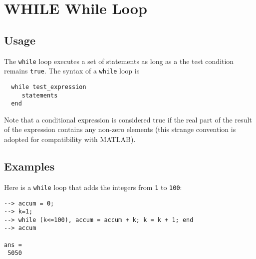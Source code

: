\section{WHILE While Loop}

\subsection{Usage}

The \verb|while| loop executes a set of statements as long as
a the test condition remains \verb|true|.  The syntax of a
\verb|while| loop is
\begin{verbatim}
  while test_expression
     statements
  end
\end{verbatim}
Note that a conditional expression is considered true if
the real part of the result of the expression contains
any non-zero elements (this strange convention is adopted
for compatibility with MATLAB).
\subsection{Examples}

Here is a \verb|while| loop that adds the integers from \verb|1|
to \verb|100|:
\begin{verbatim}
--> accum = 0;
--> k=1;
--> while (k<=100), accum = accum + k; k = k + 1; end
--> accum

ans = 
 5050 
\end{verbatim}
